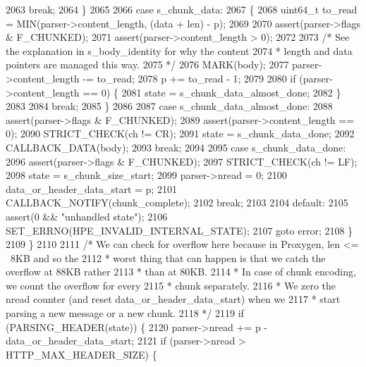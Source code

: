 \begin{DoxyCode}
2063         \textcolor{keywordflow}{break};
2064       \}
2065 
2066       \textcolor{keywordflow}{case} s_chunk_data:
2067       \{
2068         uint64\_t to\_read = MIN(parser->content_length, (data + len) - p);
2069 
2070         assert(parser->flags & F_CHUNKED);
2071         assert(parser->content_length > 0);
2072 
2073         \textcolor{comment}{/* See the explanation in s\_body\_identity for why the content}
2074 \textcolor{comment}{         * length and data pointers are managed this way.}
2075 \textcolor{comment}{         */}
2076         MARK(body);
2077         parser->content_length -= to\_read;
2078         p += to\_read - 1;
2079 
2080         \textcolor{keywordflow}{if} (parser->content_length == 0) \{
2081           state = s_chunk_data_almost_done;
2082         \}
2083 
2084         \textcolor{keywordflow}{break};
2085       \}
2086 
2087       \textcolor{keywordflow}{case} s_chunk_data_almost_done:
2088         assert(parser->flags & F_CHUNKED);
2089         assert(parser->content_length == 0);
2090         STRICT_CHECK(ch != CR);
2091         state = s_chunk_data_done;
2092         CALLBACK_DATA(body);
2093         \textcolor{keywordflow}{break};
2094 
2095       \textcolor{keywordflow}{case} s_chunk_data_done:
2096         assert(parser->flags & F_CHUNKED);
2097         STRICT_CHECK(ch != LF);
2098         state = s_chunk_size_start;
2099         parser->nread = 0;
2100         data\_or\_header\_data\_start = p;
2101         CALLBACK_NOTIFY(chunk\_complete);
2102         \textcolor{keywordflow}{break};
2103 
2104       \textcolor{keywordflow}{default}:
2105         assert(0 && \textcolor{stringliteral}{"unhandled state"});
2106         SET_ERRNO(HPE_INVALID_INTERNAL_STATE);
2107         \textcolor{keywordflow}{goto} error;
2108     \}
2109   \}
2110 
2111   \textcolor{comment}{/* We can check for overflow here because in Proxygen, len <= ~8KB and so the}
2112 \textcolor{comment}{   * worst thing that can happen is that we catch the overflow at 88KB rather}
2113 \textcolor{comment}{   * than at 80KB.}
2114 \textcolor{comment}{   * In case of chunk encoding, we count the overflow for every}
2115 \textcolor{comment}{   * chunk separately.}
2116 \textcolor{comment}{   * We zero the nread counter (and reset data\_or\_header\_data\_start) when we}
2117 \textcolor{comment}{   * start parsing a new message or a new chunk.}
2118 \textcolor{comment}{   */}
2119   \textcolor{keywordflow}{if} (PARSING_HEADER(state)) \{
2120     parser->nread += p - data\_or\_header\_data\_start;
2121     \textcolor{keywordflow}{if} (parser->nread > HTTP_MAX_HEADER_SIZE) \{

\end{DoxyCode}
